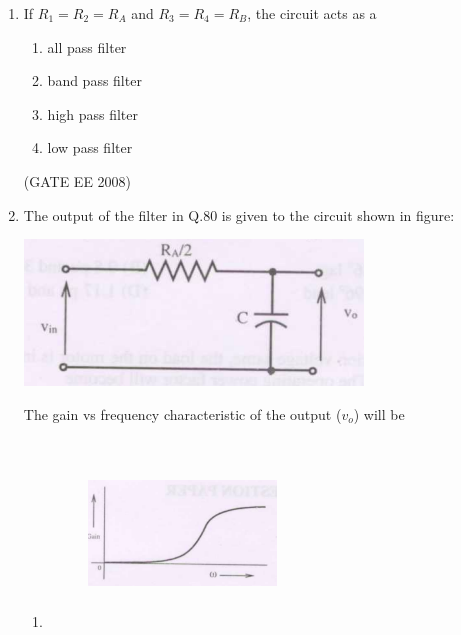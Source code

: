 \documentclass[journal,12pt,onecolumn]{IEEEtran}
\theoremstyle{remark}
\begin{document}
\begin{enumerate}[start=1, label=Q.\arabic*]
\item  If $R_1 = R_2 = R_A$ and $R_3 = R_4 = R_B$, the circuit acts as a
\begin{multicols}{2}
\begin{enumerate}[label=(\Alph*)]
    \item all pass filter
    \item band pass filter
    \item high pass filter
    \item low pass filter
\end{enumerate}
\end{multicols}
\hfill (GATE EE 2008) \\[5mm]

\item  The output of the filter in Q.80 is given to the circuit shown in figure:

\begin{center}
    \includegraphics[width=\columnwidth]{Fig/q81.png}
\end{center}
The gain vs frequency characteristic of the output ($v_o$) will be
\begin{enumerate}[label=(\Alph*)]
        
    \item 
    \begin{figure}[H]
        \includegraphics[width=5cm, height=5cm]{Fig/q81-A.png}
    \end{figure}



\end{enumerate}
\end{enumerate}
\end{document}
